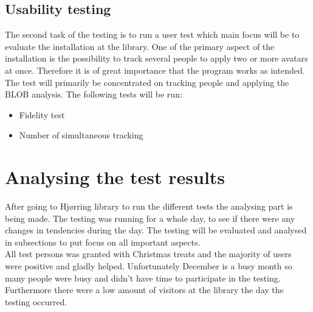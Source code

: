 \subsection{Usability testing}
The second task of the testing is to run a user test which main focus will be to evaluate the installation at the library. One of the primary aspect of the installation is the possibility to track several people to apply two or more avatars at once. Therefore it is of great importance that the program works as intended.\\
The test will primarily be concentrated on tracking people and applying the BLOB analysis. The following tests will be run:  
\begin{itemize}
\item Fidelity test
\item Number of simultaneous tracking
\end{itemize}

\section{Analysing the test results}
After going to Hj{\o}rring library to run the different tests the analysing part is being made. The testing was running for a whole day, to see if there were any changes in tendencies during the day. The testing will be evaluated and analysed in subsections to put focus on all important aspects. \\
All test persons was granted with Christmas treats and the majority of users were positive and gladly helped. Unfortunately December is a busy month so many people were busy and didn't have time to participate in the testing. Furthermore there were a low amount of visitors at the library the day the testing occurred.

